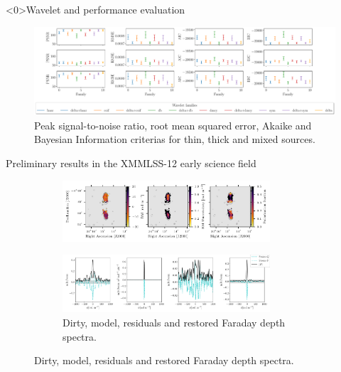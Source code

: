 \documentclass[xetex,aspectratio=169]{beamer}
\begin{document}
\begin{frame}<0>{Wavelet and performance evaluation}
	\begin{figure}
		\centering
		\includegraphics[width=\textwidth]{figures/wavelets/families_wavelets_meerkat.pdf}
		\caption*{Peak signal-to-noise ratio, root mean squared error, Akaike and Bayesian Information criterias for thin, thick and mixed sources.}

	\end{figure}
\end{frame}


\begin{frame}{Preliminary results in the XMMLSS-12 early science field}

	\begin{figure}
		\centering
		\begin{subfigure}{\textwidth}
			\centering
			\includegraphics[width=0.85\textwidth]{figures/plot_rm.pdf}
		\end{subfigure}
		\begin{subfigure}{\textwidth}
			\centering
			\includegraphics[width=0.85\textwidth]{figures/los.pdf}
			\caption{Dirty, model, residuals and restored Faraday depth spectra.}
		\end{subfigure}

	\end{figure}
\end{frame}
\end{document}
